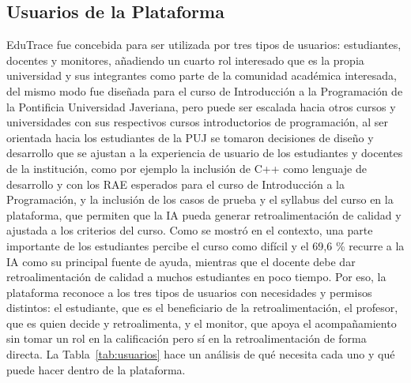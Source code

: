\documentclass[letterpaper, 10 pt, conference]{ieeeconf}
\begin{document}
\subsection{Usuarios de la Plataforma}
EduTrace fue concebida para ser utilizada por tres tipos de usuarios: estudiantes, docentes y monitores, añadiendo un cuarto rol interesado que es la propia universidad y sus integrantes como parte de la comunidad académica interesada, del mismo modo fue diseñada para el curso de Introducción a la Programación de la Pontificia Universidad Javeriana, pero puede ser escalada hacia otros cursos y universidades con sus respectivos cursos introductorios de programación, 
al ser orientada hacia los estudiantes de la PUJ se tomaron decisiones de diseño y desarrollo que se ajustan a la experiencia de usuario de los estudiantes y docentes de la institución, como por ejemplo la inclusión de C++ como lenguaje de desarrollo y con los RAE esperados para el curso de Introducción a la Programación, y la inclusión de los casos de prueba y el syllabus del curso en la plataforma, que permiten que la IA pueda generar retroalimentación de calidad y ajustada a los criterios del curso.
Como se mostró en el contexto, una parte importante de los estudiantes percibe el curso como difícil y el 69,6 \% recurre a la IA como su principal fuente de ayuda, mientras que el docente debe dar retroalimentación de calidad a muchos estudiantes en poco tiempo.
Por eso, la plataforma reconoce a los tres tipos de usuarios con necesidades y permisos distintos: el estudiante, que es el beneficiario de la retroalimentación, el profesor, que es quien decide y retroalimenta, y el monitor, que apoya el acompañamiento sin tomar un rol en la calificación pero sí en la retroalimentación de forma directa.
La Tabla~\ref{tab:usuarios} hace un análisis de qué necesita cada uno y qué puede hacer dentro de la plataforma.
\end{document}
